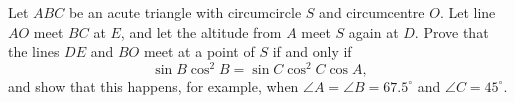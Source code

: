 Let $ABC$ be an acute triangle with circumcircle $S$ and circumcentre $O$. Let line $AO$ meet $BC$ at $E$, and let the altitude from $A$ meet $S$ again at $D$. Prove that the lines $DE$ and $BO$ meet at a point of $S$ if and only if
\[
\sin B\cos^2B=\sin C\cos^2C\cos A,
\]
and show that this happens, for example, when $\angle A=\angle B=67.5^\circ$ and $\angle C=45^\circ$.
